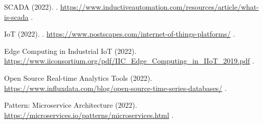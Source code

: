 \begin{thebibliography}{99}
    SCADA (2022).
    .
    \newblock \url{https://www.inductiveautomation.com/resources/article/what-is-scada}
    \newblock [Accessed: 01/01/2024].

    IoT (2022).
    .
    \newblock \url{https://www.postscapes.com/internet-of-things-platforms/}
    \newblock [Accessed: 01/01/2024].

    Edge Computing in Industrial IoT (2022).
    \newblock \url{https://www.iiconsortium.org/pdf/IIC_Edge_Computing_in_IIoT_2019.pdf}
    \newblock [Accessed: 01/01/2024].

    Open Source Real-time Analytics Tools (2022).
    \newblock \url{https://www.influxdata.com/blog/open-source-time-series-databases/}
    \newblock [Accessed: 01/01/2024].

    {Pattern: Microservice Architecture} (2022).
    \newblock \url{https://microservices.io/patterns/microservices.html}
    \newblock [Accessed: 27/12/2022].

\end{thebibliography}

